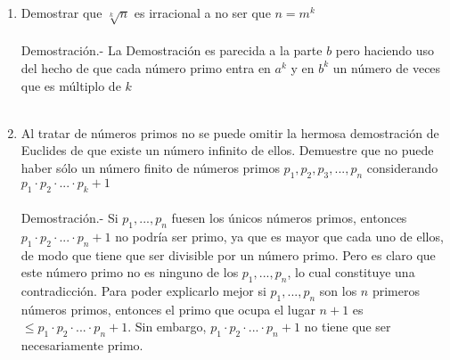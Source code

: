 \begin{enumerate}
\begin{enumerate}[\bfseries a)]
         \item Demostrar que $\sqrt[k]{n}$ es irracional a no ser que $n=m^k$\\\\
         Demostración.- \; La Demostración es parecida a la parte $b$ pero haciendo uso del hecho de que cada número primo entra en $a^k$ y en $b^k$ un número de veces que es múltiplo de $k$\\\\   

         \item Al tratar de números primos no se puede omitir la hermosa demostración de Euclides de que existe un número infinito de ellos. Demuestre que no puede haber sólo un número finito de números primos $p_1, p_2, p_3,...,p_n$ considerando $p_1\cdot p_2 \cdot ... \cdot p_k + 1$\\\\
         Demostración.- \; Si $p_1,...,p_n$ fuesen los únicos números primos, entonces $p_1 \cdot p_2 \cdot ... \cdot p_n + 1$ no podría ser primo, ya que es mayor que cada uno de ellos, de modo que tiene que ser divisible por un número primo. Pero es claro que este número primo no es ninguno de los $p_1,...,p_n$, lo cual constituye una contradicción. Para poder explicarlo mejor si $p_1,...,p_n$ son los $n$ primeros números primos, entonces el primo que ocupa el lugar $n+1$ es $\leq p_1 \cdot p_2 \cdot ... \cdot p_n+1$. Sin embargo, $p_1\cdot p_2 \cdot ...\cdot p_n + 1$ no tiene que ser necesariamente primo.\\\\       
         \end{enumerate} 


\end{enumerate}
